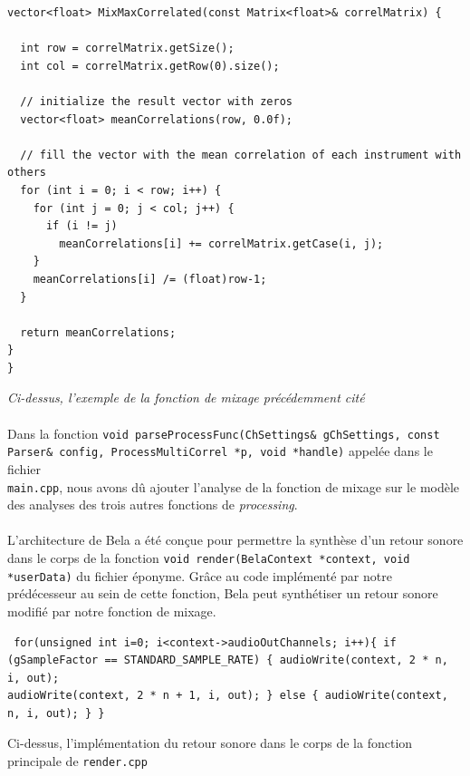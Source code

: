 \begin{lstlisting}
vector<float> MixMaxCorrelated(const Matrix<float>& correlMatrix) {

  int row = correlMatrix.getSize();
  int col = correlMatrix.getRow(0).size();

  // initialize the result vector with zeros
  vector<float> meanCorrelations(row, 0.0f);

  // fill the vector with the mean correlation of each instrument with others
  for (int i = 0; i < row; i++) {
    for (int j = 0; j < col; j++) {
      if (i != j)
        meanCorrelations[i] += correlMatrix.getCase(i, j);
    }
    meanCorrelations[i] /= (float)row-1;
  }

  return meanCorrelations;
}
}
\end{lstlisting}

\begin{center}
 \textit{Ci-dessus, l'exemple de la fonction de mixage précédemment cité}
\end{center}

\paragraph{}
Dans la fonction
\verb!void parseProcessFunc(ChSettings& gChSettings, const!
\\ \verb!Parser& config, ProcessMultiCorrel *p, void *handle)!
appelée dans le fichier \\ \verb!main.cpp!, nous avons dû ajouter
l'analyse de la fonction de mixage sur le modèle des analyses des
trois autres fonctions de \textit{processing}.

\paragraph{}
L'architecture de Bela a été conçue pour permettre la synthèse d'un
retour sonore dans le corps de la fonction
\verb!void render(BelaContext *context, void *userData)! du fichier
éponyme. Grâce au code implémenté par notre prédécesseur au sein de
cette fonction, Bela peut synthétiser un retour sonore modifié par
notre fonction de mixage.

\begin{lstlisting} for(unsigned int i=0; i<context->audioOutChannels; i++){ if
(gSampleFactor == STANDARD_SAMPLE_RATE) { audioWrite(context, 2 * n, i, out);
audioWrite(context, 2 * n + 1, i, out); } else { audioWrite(context, n, i, out); } }
\end{lstlisting} \begin{center} Ci-dessus, l'implémentation du retour sonore
dans le corps de la fonction principale de \verb!render.cpp! \end{center}

